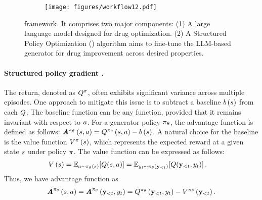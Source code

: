 \begin{figure*}[t]
    \begin{subfigure}{1\textwidth}
        \centering
        \texttt{[image: figures/workflow12.pdf]}
    \end{subfigure}
    \caption{{\fwname framework.} 
    {It comprises two major components: {(1)  A large language model designed for drug optimization.} (2) A Structured Policy Optimization (\algname) algorithm aims to fine-tune the LLM-based generator for drug improvement across desired properties. 
    }
    }
  \label{fig:drugimprover_framework}
\end{figure*}




\paragraph{Structured policy gradient .} 
The return, denoted as $Q^{\pi}$, often exhibits significant variance across multiple episodes. One approach to mitigate this issue is to subtract a baseline $b \left( {s} \right) $ from each $Q$. The baseline function can be any function, provided that it remains invariant with respect to $a$. For a generator policy $\pi_{{\theta}}$, the advantage function \citep{sutton1999policy} is defined as follows:
    $\textbf{\em A}^{\pi_{{\theta}}} \left( {s,a} \right)  = Q^{\pi_{{\theta}}} \left( {s,a} \right)  - b \left( {s} \right) $.
A natural choice for the baseline is the value function $V^{\pi} \left( {s} \right) $, which represents the expected reward at a given state $s$ under policy $\pi$. The value function can be expressed as follows:
\begin{align}
V \left( {s} \right) &=\mathbb{E}_{a\sim\pi_{{\theta}} \left( {s} \right) }\!\left[Q(s,a)\right]
=\mathbb{E}_{y_t\sim\pi_{{\theta}} \left( {\mathbf{y}_{<t}} \right) }\!\left[Q(
\mathbf{y}_{<t},y_t)\right].\notag
\end{align}
Thus, we have advantage function as 
\begin{align}
     \textbf{\em A}^{\pi_{{\theta}}} \left( {s,a} \right)  =\textbf{\em A}^{\pi_{{\theta}}} \left( {\mathbf{y}_{<t},y_{t}} \right) 
     =Q^{\pi_{{\theta}}} \left( {\mathbf{y}_{<t},y_t} \right) -V^{\pi_{{\theta}}} \left( {\mathbf{y}_{<t}} \right) .\notag
\end{align}






